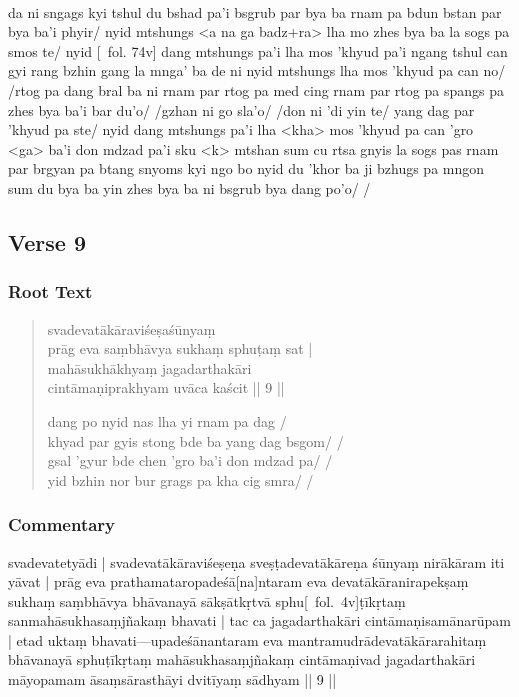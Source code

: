 \documentclass[12pt]{article}
\newcommand{\emdash} {\hspace{0em}—\hspace{0em}}
\begin{document}
\textbf{\TVB}\\
da ni sngags kyi tshul du bshad pa'i bsgrub par bya ba rnam pa bdun bstan par bya ba'i phyir/ nyid mtshungs <a na ga badz+ra> lha mo zhes bya ba la sogs pa smos te/ nyid [\TVB\ fol. 74v] dang mtshungs pa'i lha mos 'khyud pa'i ngang tshul can gyi rang bzhin gang la mnga' ba de ni nyid mtshungs lha mos 'khyud pa can no/ /rtog pa dang bral ba ni rnam par rtog pa med cing rnam par rtog pa spangs pa zhes bya ba'i bar du'o/ /gzhan ni go sla'o/ /don ni 'di yin te/ yang dag par 'khyud pa ste/ nyid dang mtshungs pa'i lha <kha> mos 'khyud pa can 'gro <ga> ba'i don mdzad pa'i sku <k> mtshan sum cu rtsa gnyis la sogs pas rnam par brgyan pa btang snyoms kyi ngo bo nyid du 'khor ba ji bzhugs pa mngon sum du bya ba yin zhes bya ba ni bsgrub bya dang po'o/ /

\subsection{Verse 9}
\subsubsection{Root Text}
\begin{quote}
	svadevatākāraviśeṣaśūnyaṃ \\
	prāg eva saṃbhāvya sukhaṃ sphuṭaṃ sat |\\
	mahāsukhākhyaṃ jagadarthakāri \\
	cintāmaṇiprakhyam uvāca kaścit || 9 ||

	dang po nyid nas lha yi rnam pa dag /\\
	khyad par gyis stong bde ba yang dag bsgom/ /\\
	gsal 'gyur bde chen 'gro ba'i don mdzad pa/ /\\
	yid bzhin nor bur grags pa kha cig smra/ /
\end{quote}

\subsubsection{Commentary}
svadevatetyādi | svadevatākāraviśeṣeṇa sveṣṭadevatākāreṇa śūnyaṃ nirākāram iti yāvat | prāg eva prathamataropadeśā[na]ntaram eva devatākāranirapekṣaṃ sukhaṃ saṃbhāvya bhāvanayā sākṣātkṛtvā sphu[\MS\ fol.\ 4v]ṭīkṛtaṃ sanmahāsukhasaṃjñakaṃ bhavati | tac ca jagadarthakāri cintāmaṇisamānarūpam | etad uktaṃ bhavati\emdash upadeśānantaram eva mantramudrādevatākārarahitaṃ bhāvanayā sphuṭīkṛtaṃ mahāsukhasaṃjñakaṃ cintāmaṇivad jagadarthakāri māyopamam āsaṃsārasthāyi dvitīyaṃ sādhyam || 9 ||\\
\end{document}
